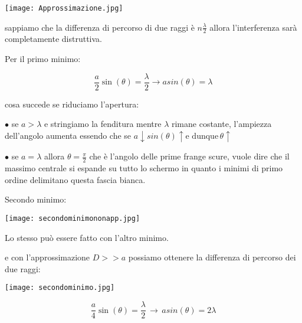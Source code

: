 \documentclass[a4paper,11pt]{article}
\begin{document}
\begin{center}
    \begin{minipage}{8cm}
    \texttt{[image: Approssimazione.jpg]}
    \end{minipage}

    \vspace{2mm}
\end{center}

sappiamo che la differenza di percorso di due raggi è \( n  \frac{\lambda}{2} \) allora l'interferenza sarà completamente distruttiva.
\pagebreak

Per il primo minimo:
\begin{center}
\[
    \frac{a}{2} \sin(\theta) = \frac{\lambda}{2} \to a sin(\theta) = \lambda
\]
\end{center}

cosa succede se riduciamo l'apertura:

$\bullet$ se \(  a > \lambda  \)  e stringiamo la fenditura mentre \( \lambda \) rimane costante, l'ampiezza dell'angolo aumenta essendo che se \( a \downarrow sin(\theta) \uparrow \text{e dunque} \, \theta \uparrow    \)

$\bullet$ se \(  a = \lambda  \) allora \( \theta = \frac{\pi}{2} \) che è l'angolo delle prime frange scure, vuole dire che il massimo centrale si espande su tutto lo schermo in quanto i minimi di primo ordine delimitano questa fascia bianca.


Secondo minimo: 




\begin{minipage}{8cm}
    \texttt{[image: secondominimononapp.jpg]}
    \end{minipage}
    \begin{minipage}{8cm}
    Lo stesso può essere fatto con l'altro minimo.
    \end{minipage}

    \vspace{2mm}

e con l'approssimazione \(  D >> a \) possiamo ottenere la differenza di percorso dei due raggi:


    \begin{minipage}{8cm}
    \texttt{[image: secondominimo.jpg]}
    \end{minipage}
    \begin{minipage}{8cm}
        \[
            \frac{a}{4} \sin(\theta) = \frac{\lambda}{2} \, \to \, a sin(\theta) = 2 \lambda   
        \]
        \end{minipage}
    \vspace{2mm}
\end{document}
